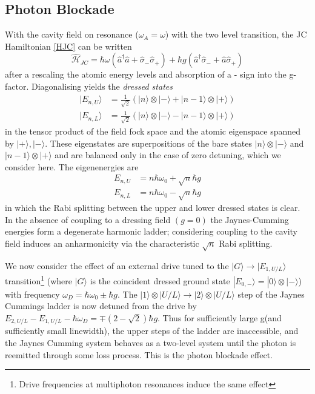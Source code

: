 \documentclass[reqno]{amsart}
\newcommand{\ham}{\hat{\mathscr{H}}}
\newcommand{\cre}{\hat{a}^\dagger}
\newcommand{\ann}{\hat{a}}
\newcommand{\atann}{\hat{\sigma}_-}
\newcommand{\atcre}{\hat{\sigma}_+}
\newcommand{\ket}[1]{| #1 \rangle}
\newcommand{\kettens}[2]{\ket{#1} \otimes \ket{#2}}
\begin{document}
\subsection{Photon Blockade}
With the cavity field on resonance ($\omega_A = \omega$) with the two level transition, the JC Hamiltonian \ref{HJC} can be written\autocite[3]{Carmichael2015}
\begin{equation}
	\ham_{JC} = \hbar \omega (\cre \ann + \atann \atcre) +\hbar g (\cre \atann + \hat{a} \atcre)
\end{equation}
after a rescaling the atomic energy levels and absorption of a - sign into the g-factor. Diagonalising yields the \emph{dressed states}
\begin{align}
	\ket{E_{n, U}} & = \frac{1}{\sqrt{2}} (\kettens{n}{-}+\kettens{n-1}{+}) \\
	\ket{E_{n, L}} & = \frac{1}{\sqrt{2}} (\kettens{n}{-}-\kettens{n-1}{+})
\end{align} 
in the tensor product of the field fock space and the atomic eigenspace spanned by $\ket{+}, \ket{-}$. These eigenstates are superpositions of the bare states $\kettens{n}{-}$ and $\kettens{n-1}{+}$ and are balanced only in the case of zero detuning, which we consider here. The eigenenergies are 
\begin{align}
	E_{n, U} &= n \hbar \omega_0 + \sqrt{n} \hbar g \\
	E_{n, L} &= n \hbar \omega_0 - \sqrt{n} \hbar g
\end{align}
in which the Rabi splitting between the upper and lower dressed states is clear. In the absence of coupling to a dressing field $(g=0)$ the Jaynes-Cumming energies form a degenerate harmonic ladder; considering coupling to the cavity field induces an anharmonicity via the characteristic $\sqrt{n}$ Rabi splitting.

We now consider the effect of an external drive tuned to the $\ket{G} \rightarrow \ket{E_{1, U/L}}$ transition\footnote{Drive frequencies at multiphoton resonances induce the same effect} (where $\ket{G}$ is the coincident dressed ground state $\ket{E_{0, -}} = \kettens{0}{-}$) with frequency $\omega_D = \hbar \omega_0 \pm \hbar g$.
The $\kettens{1}{U/L} \rightarrow \kettens{2}{U/L}$ step of the Jaynes Cummings ladder is now detuned from the drive by $E_{2, U/L} - E_{1, U/L} - \hbar \omega_D =  \mp(2-\sqrt{2}) \hbar g$. Thus for sufficiently large g(and sufficiently small linewidth), the upper steps of the ladder are inaccessible, and the Jaynes Cumming system behaves as a two-level system until the photon is reemitted through some loss process. This is the photon blockade effect.
\end{document}
